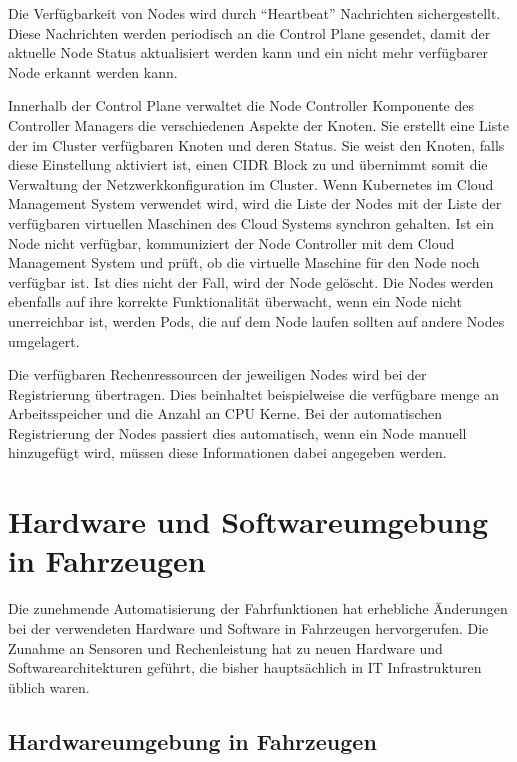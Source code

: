 Die Verfügbarkeit von Nodes wird durch \enquote{Heartbeat} Nachrichten sichergestellt. Diese Nachrichten werden periodisch an die Control Plane gesendet, damit der aktuelle Node Status aktualisiert werden kann und ein nicht mehr verfügbarer Node erkannt werden kann. 

Innerhalb der Control Plane verwaltet die Node Controller Komponente des Controller Managers die verschiedenen Aspekte der Knoten. Sie erstellt eine Liste der im Cluster verfügbaren Knoten und deren Status. Sie weist den Knoten, falls diese Einstellung aktiviert ist, einen \gls{CIDR} Block zu und übernimmt somit die Verwaltung der Netzwerkkonfiguration im Cluster. Wenn Kubernetes im Cloud Management System verwendet wird, wird die Liste der Nodes mit der Liste der verfügbaren virtuellen Maschinen des Cloud Systems synchron gehalten. Ist ein Node nicht verfügbar, kommuniziert der Node Controller mit dem Cloud Management System und prüft, ob die virtuelle Maschine für den Node noch verfügbar ist. Ist dies nicht der Fall, wird der Node gelöscht. Die Nodes werden ebenfalls auf ihre korrekte Funktionalität überwacht, wenn ein Node nicht unerreichbar ist, werden Pods, die auf dem Node laufen sollten auf andere Nodes umgelagert. 

Die verfügbaren Rechenressourcen der jeweiligen Nodes wird bei der Registrierung übertragen. Dies beinhaltet beispielweise die verfügbare menge an Arbeitsspeicher und die Anzahl an CPU Kerne. Bei der automatischen Registrierung der Nodes passiert dies automatisch, wenn ein Node manuell hinzugefügt wird, müssen diese Informationen dabei angegeben werden. 

\section{Hardware und Softwareumgebung in Fahrzeugen}

Die zunehmende Automatisierung der Fahrfunktionen hat erhebliche Änderungen bei der verwendeten Hardware und Software in Fahrzeugen hervorgerufen. Die Zunahme an Sensoren und Rechenleistung hat zu neuen Hardware und Softwarearchitekturen geführt, die bisher hauptsächlich in IT Infrastrukturen üblich waren. 

\subsection{Hardwareumgebung in Fahrzeugen}
\label{Hardwareumgebung in Fahrzeugen}

